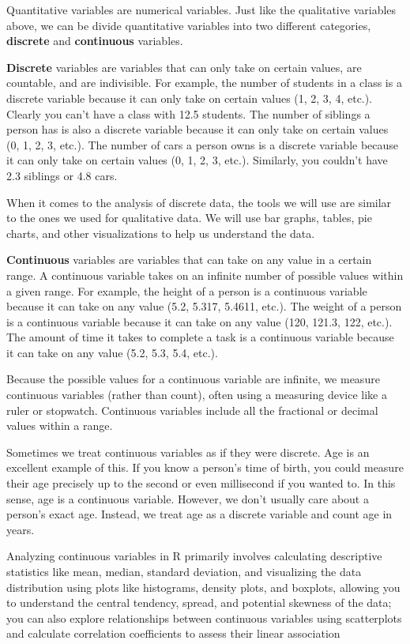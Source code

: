 \documentclass[
  letterpaper,
  DIV=11,
  numbers=noendperiod]{scrreprt}
\begin{document}

Quantitative variables are numerical variables. Just like the
qualitative variables above, we can be divide quantitative variables
into two different categories, \textbf{discrete} and \textbf{continuous}
variables.

\textbf{Discrete} variables are variables that can only take on certain
values, are countable, and are indivisible. For example, the number of
students in a class is a discrete variable because it can only take on
certain values (1, 2, 3, 4, etc.). Clearly you can't have a class with
12.5 students. The number of siblings a person has is also a discrete
variable because it can only take on certain values (0, 1, 2, 3, etc.).
The number of cars a person owns is a discrete variable because it can
only take on certain values (0, 1, 2, 3, etc.). Similarly, you couldn't
have 2.3 siblings or 4.8 cars.

When it comes to the analysis of discrete data, the tools we will use
are similar to the ones we used for qualitative data. We will use bar
graphs, tables, pie charts, and other visualizations to help us
understand the data.

\textbf{Continuous} variables are variables that can take on any value
in a certain range. A continuous variable takes on an infinite number of
possible values within a given range. For example, the height of a
person is a continuous variable because it can take on any value (5.2,
5.317, 5.4611, etc.). The weight of a person is a continuous variable
because it can take on any value (120, 121.3, 122, etc.). The amount of
time it takes to complete a task is a continuous variable because it can
take on any value (5.2, 5.3, 5.4, etc.).

Because the possible values for a continuous variable are infinite, we
measure continuous variables (rather than count), often using a
measuring device like a ruler or stopwatch. Continuous variables include
all the fractional or decimal values within a range.

Sometimes we treat continuous variables as if they were discrete. Age is
an excellent example of this. If you know a person's time of birth, you
could measure their age precisely up to the second or even millisecond
if you wanted to. In this sense, age is a continuous variable. However,
we don't usually care about a person's exact age. Instead, we treat age
as a discrete variable and count age in years.

Analyzing continuous variables in R primarily involves calculating
descriptive statistics like mean, median, standard deviation, and
visualizing the data distribution using plots like histograms, density
plots, and boxplots, allowing you to understand the central tendency,
spread, and potential skewness of the data; you can also explore
relationships between continuous variables using scatterplots and
calculate correlation coefficients to assess their linear association
\end{document}
